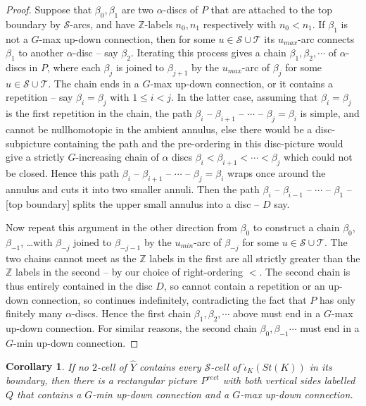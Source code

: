 \documentclass[12pt,a4paper]{amsart}
\def\Z{\mathbb{Z}}
\def\wh{\widehat}
\def\a{\alpha}
\def\b{\beta}
\def\cS{\mathcal{S}}
\def\cT{\mathcal{T}}
\newtheorem{cor}[thm]{Corollary}
\begin{document}
 \begin{proof}
 	Suppose that $\b_0,\b_1$ are two $\a$-discs of $P$ that are attached to the top boundary by $\cS$-arcs, and have $\Z$-labels $n_0,n_1$ respectively with $n_0<n_1$.   
 	If $\b_1$ is not a $G$-max up-down connection, 
 	then for some $u\in\cS\cup\cT$  its $u_{max}$-arc connects $\b_1$ to another $\a$-disc -- say $\b_2$.    
 	Iterating this process gives a  chain 
  $\b_1,\b_2,\cdots$ of $\a$-discs in $P$,  
 	where each $\b_j$ is joined to $\b_{j+1}$ by the  $u_{max}$-arc  of $\b_j$ for some $u\in\cS\cup\cT$.   
 	The chain ends in a  $G$-max up-down connection, 
 	or it contains a repetition -- say $\b_i=\b_j$ with $1\le i<j$. 
 	In the latter case, 
 		assuming that $\b_i=\b_j$ is the first repetition in the chain,
 	the path $\b_i$ -- $\b_{i+1}$ -- $\cdots$ -- $\b_j=\b_i$ 
 	 is simple, and cannot be nullhomotopic in 
 	 the ambient annulus, 
 	else there  would be a 
 	 disc-subpicture containing the path and the pre-ordering in this  disc-picture
 	would give a strictly $G$-increasing chain of $\a$ discs $\b_i<\b_{i+1}<\cdots<\b_j$ which 
 		could not be closed.   
 	 Hence
 	this path
 	 $\b_i$ -- $\b_{i+1}$ -- $\cdots$ -- $\b_j=\b_i$
 		wraps once around the annulus and cuts it 
 	into two smaller annuli.  
 	Then the path $\b_i$ -- $\b_{i-1}$ -- $\cdots$ -- $\b_1$ -- [top boundary] 
	splits the upper small annulus into a disc --  $D$ say.
 	
 	Now repeat this argument in the other direction from $\b_0$ to construct a 
 	chain $\b_0$, $\b_{-1}$, \dots with 
 	$\b_{-j}$ joined to $\b_{-j-1}$ 
 	by the $u_{min}$-arc of $\b_{-j}$ for some $u\in\cS\cup\cT$.  
 	The two chains cannot meet as the $\Z$ labels in the first are all strictly 
 	greater than the $\Z$ labels in the second
  -- by our choice of right-ordering $<$.
 	The second chain is thus entirely contained in the disc $D$, 
 	so cannot contain a repetition or an up-down connection, so continues indefinitely, 
 	contradicting the fact that $P$ has only finitely many $\a$-discs.  
 	Hence the first chain $\b_1,\b_2,\cdots$ above must end in a $G$-max up-down connection.   
 	For similar reasons, the second chain  $\b_0,\b_{-1}\cdots$ must end in a  
 	$G$-min up-down connection.
 \end{proof}
 

 	\begin{cor}\label{everyedge}
 		If no $2$-cell of $\wh Y$ contains every $\cS$-cell of $\wh{\iota}_K(St(K))$ in its boundary, then there is a rectangular picture $P^{rect}$ with both vertical sides labelled $Q$ that contains a $G$-min up-down connection and a $G$-max up-down connection.
 	\end{cor}
 
\end{document}
